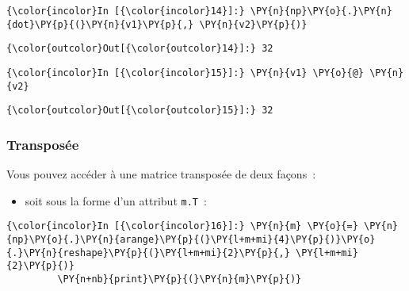     \begin{Verbatim}[commandchars=\\\{\},frame=single,framerule=0.3mm,rulecolor=\color{cellframecolor}]
{\color{incolor}In [{\color{incolor}14}]:} \PY{n}{np}\PY{o}{.}\PY{n}{dot}\PY{p}{(}\PY{n}{v1}\PY{p}{,} \PY{n}{v2}\PY{p}{)}
\end{Verbatim}


\begin{Verbatim}[commandchars=\\\{\},frame=single,framerule=0.3mm,rulecolor=\color{cellframecolor}]
{\color{outcolor}Out[{\color{outcolor}14}]:} 32
\end{Verbatim}
            
    \begin{Verbatim}[commandchars=\\\{\},frame=single,framerule=0.3mm,rulecolor=\color{cellframecolor}]
{\color{incolor}In [{\color{incolor}15}]:} \PY{n}{v1} \PY{o}{@} \PY{n}{v2}
\end{Verbatim}


\begin{Verbatim}[commandchars=\\\{\},frame=single,framerule=0.3mm,rulecolor=\color{cellframecolor}]
{\color{outcolor}Out[{\color{outcolor}15}]:} 32
\end{Verbatim}
            
    \hypertarget{transposuxe9e}{%
\subsubsection{Transposée}\label{transposuxe9e}}

    Vous pouvez accéder à une matrice transposée de deux façons~:

    \begin{itemize}
\tightlist
\item
  soit sous la forme d'un attribut \texttt{m.T}~:
\end{itemize}

    \begin{Verbatim}[commandchars=\\\{\},frame=single,framerule=0.3mm,rulecolor=\color{cellframecolor}]
{\color{incolor}In [{\color{incolor}16}]:} \PY{n}{m} \PY{o}{=} \PY{n}{np}\PY{o}{.}\PY{n}{arange}\PY{p}{(}\PY{l+m+mi}{4}\PY{p}{)}\PY{o}{.}\PY{n}{reshape}\PY{p}{(}\PY{l+m+mi}{2}\PY{p}{,} \PY{l+m+mi}{2}\PY{p}{)}
         \PY{n+nb}{print}\PY{p}{(}\PY{n}{m}\PY{p}{)}
\end{Verbatim}


